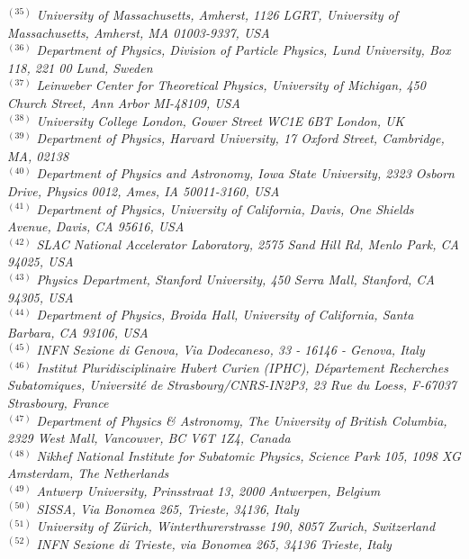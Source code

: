 {\begin{center}
$^{(35)}$ \emph{University of Massachusetts, Amherst, 1126 LGRT, University of Massachusetts, Amherst, MA 01003-9337, USA}\\
$^{(36)}$ \emph{Department of Physics, Division of Particle Physics, Lund University, Box 118, 221 00 Lund, Sweden}\\
$^{(37)}$ \emph{Leinweber Center for Theoretical Physics, University of Michigan, 450 Church Street, Ann Arbor MI-48109, USA}\\
$^{(38)}$ \emph{University College London, Gower Street WC1E 6BT London, UK}\\
$^{(39)}$ \emph{Department of Physics, Harvard University, 17 Oxford Street, Cambridge, MA, 02138}\\
$^{(40)}$ \emph{Department of Physics and Astronomy, Iowa State University, 2323 Osborn Drive, Physics 0012, Ames, IA 50011-3160, USA}\\
$^{(41)}$ \emph{Department of Physics, University of California, Davis, One Shields Avenue, Davis, CA 95616, USA}\\
$^{(42)}$ \emph{SLAC National Accelerator Laboratory, 2575 Sand Hill Rd, Menlo Park, CA 94025, USA}\\
$^{(43)}$ \emph{Physics Department, Stanford University, 450 Serra Mall, Stanford, CA 94305, USA}\\
$^{(44)}$ \emph{Department of Physics, Broida Hall, University of California, Santa Barbara, CA 93106, USA}\\
$^{(45)}$ \emph{INFN Sezione di Genova, Via Dodecaneso, 33 - 16146 - Genova, Italy}\\
$^{(46)}$ \emph{Institut Pluridisciplinaire Hubert Curien (IPHC), D\'epartement Recherches Subatomiques, Universit\'e de Strasbourg/CNRS-IN2P3, 23 Rue du Loess, F-67037 Strasbourg, France}\\
$^{(47)}$ \emph{Department of Physics \& Astronomy, The University of British Columbia, 2329 West Mall, Vancouver, BC V6T 1Z4, Canada}\\
$^{(48)}$ \emph{Nikhef National Institute for Subatomic Physics, Science Park 105, 1098 XG Amsterdam, The Netherlands}\\
$^{(49)}$ \emph{Antwerp University, Prinsstraat 13, 2000 Antwerpen, Belgium}\\
$^{(50)}$ \emph{SISSA, Via Bonomea 265, Trieste, 34136, Italy}\\
$^{(51)}$ \emph{University of Z\"urich, Winterthurerstrasse 190, 8057 Zurich, Switzerland}\\
$^{(52)}$ \emph{INFN Sezione di Trieste, via Bonomea 265, 34136 Trieste, Italy}\\

\end{center}}

